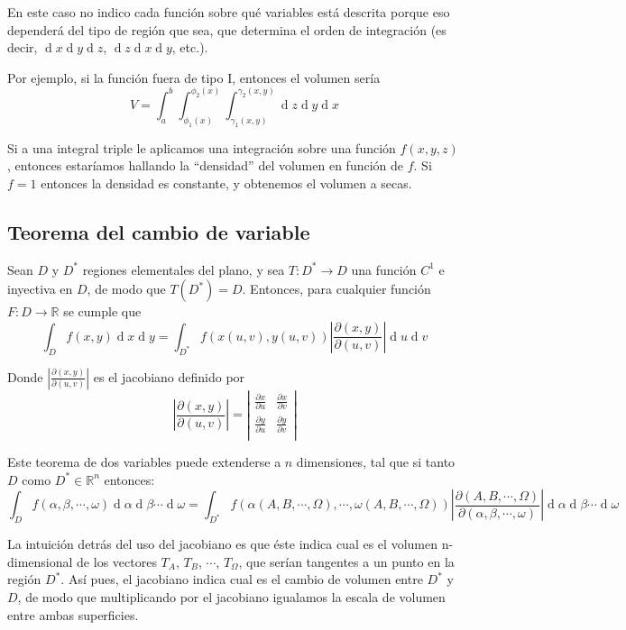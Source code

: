 \documentclass[a4paper]{article}
\renewcommand{\d}[1]{\ensuremath{\operatorname{d}\!{#1}}}
\begin{document}
En este caso no indico cada función sobre qué variables está descrita porque eso dependerá del tipo de región que sea, que determina el orden de integración (es decir, $\d{x} \d{y} \d{z}$, $\d{z} \d{x} \d{y}$, etc.).

Por ejemplo, si la función fuera de tipo I, entonces el volumen sería
\[V = \int _ { a } ^ { b } \int _ { \phi _ { 1 } ( x ) } ^ { \phi _ { 2 } ( x ) } \int _ { \gamma _ { 1 } ( x , y ) } ^ { \gamma _ { 2 } ( x , y ) } \d{z}\d{y}\d{x}\]

Si a una integral triple le aplicamos una integración sobre una función $f(x,y,z)$, entonces estaríamos hallando la ``densidad'' del volumen en función de $f$. Si $f=1$ entonces la densidad es constante, y obtenemos el volumen a secas.

\subsection{Teorema del cambio de variable}
Sean $D$ y $D^*$ regiones elementales del plano, y sea $T:D^*\rightarrow D$ una función $C^1$ e inyectiva en $D$, de modo que $T(D^*) = D$. Entonces, para cualquier función $F:D\rightarrow \mathbb{R}$ se cumple que
\[ \int_Df(x,y) \d{x}\d{y} = \int_{D^*} f(x(u,v), y(u,v)) \left|\frac{\partial(x,y)}{\partial(u,v)}\right|\d{u}\d{v} \]

Donde $\left|\frac{\partial(x,y)}{\partial(u,v)}\right|$ es el jacobiano definido por 
\[ \left|\frac{\partial(x,y)}{\partial(u,v)}\right| = \left|
\begin{matrix}
\frac{\partial x}{\partial u} & \frac{\partial x}{\partial v} \\
\frac{\partial y}{\partial u} & \frac{\partial y}{\partial v} \\
\end{matrix}\right| \]

Este teorema de dos variables puede extenderse a $n$ dimensiones, tal que si tanto $D$ como $D^* \in \mathbb{R}^n$ entonces:
\[ \int_Df(\alpha, \beta, \cdots, \omega) \d{\alpha}\d{\beta}\cdots\d{\omega} = \int_{D^*} f(\alpha(A, B, \cdots, \Omega), \cdots, \omega(A, B, \cdots, \Omega))\left|\frac{\partial(A, B, \cdots, \Omega)}{\partial(\alpha, \beta, \cdots, \omega)}\right| \d{\alpha}\d{\beta}\cdots\d{\omega}  \]

La intuición detrás del uso del jacobiano es que éste indica cual es el volumen n-dimensional de los vectores $T_A$, $T_B$, $\cdots$, $T_\Omega$, que serían tangentes a un punto en la región $D^*$. Así pues, el jacobiano indica cual es el cambio de volumen entre $D^*$ y $D$, de modo que multiplicando por el jacobiano igualamos la escala de volumen entre ambas superficies.
\end{document}

